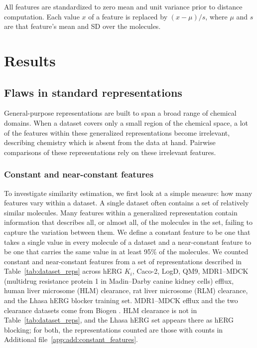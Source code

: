 All features are standardized to zero mean and unit variance prior to distance computation. Each value $x$ of a feature is replaced by $(x-\mu)/s$, where $\mu$ and $s$ are that feature's mean and SD over the molecules.

\section{Results}

\subsection{Flaws in standard representations}\label{sec:flaws:representations}

General-purpose representations are built to span a broad range of chemical domains. When a dataset covers only a small region of the chemical space, a lot of the features within these generalized representations become irrelevant, describing chemistry which is absent from the data at hand. Pairwise comparisons of these representations rely on these irrelevant features.

\subsubsection{Constant and near-constant features}\label{sec:flaws:constant} 

To investigate similarity estimation, we first look at a simple measure: how many features vary within a dataset. A single dataset often contains a set of relatively similar molecules. Many features within a generalized representation contain information that describes all, or almost all, of the molecules in the set, failing to capture the variation between them. We define a constant feature to be one that takes a single value in every molecule of a dataset and a near-constant feature to be one that carries the same value in at least 95\% of the molecules. We counted constant and near-constant features from a set of representations described in Table~\ref{tab:dataset_reps} across hERG $K_i$, Caco-2, LogD, QM9, MDR1--MDCK (multidrug resistance protein 1 in Madin--Darby canine kidney cells) efflux, human liver microsome (HLM) clearance, rat liver microsome (RLM) clearance, and the Lhasa hERG blocker training set. MDR1--MDCK efflux and the two clearance datasets come from Biogen \citep{fang2023}. HLM clearance is not in Table~\ref{tab:dataset_reps}, and the Lhasa hERG set appears there as hERG blocking; for both, the representations counted are those with counts in Additional file~\ref{app:add:constant_features}.

